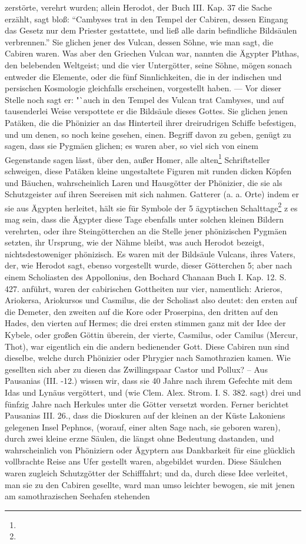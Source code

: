 \documentclass[a4paper, 11pt, oneside, polutonikogreek, german]{article}
\begin{document}
zerstörte, verehrt wurden; allein Herodot, der Buch III. Kap. 37 die Sache erzählt, sagt bloß: "`Cambyses trat in den Tempel der Cabiren, dessen Eingang das Gesetz nur dem Priester gestattete, und ließ alle darin befindliche Bildsäulen verbrennen."' Sie glichen jener des Vulcan, dessen Söhne, wie man sagt, die Cabiren waren. Was aber den Griechen Vulcan war, nannten die Ägypter Phthas, den belebenden Weltgeist; und die vier Untergötter, seine Söhne, mögen sonach entweder die Elemente, oder die fünf Sinnlichkeiten, die in der indischen und persischen Kosmologie gleichfalls erscheinen, vorgestellt haben. --- Vor dieser Stelle noch sagt er: "`auch in den Tempel des Vulcan trat Cambyses, und auf tausenderlei Weise verspottete er die Bildsäule dieses Gottes. Sie glichen jenen Patäken, die die Phönizier an das Hinterteil ihrer dreirudrigen Schiffe befestigen, und um denen, so noch keine gesehen, einen. Begriff davon zu geben, genügt zu sagen, dass sie Pygmäen glichen; es waren aber, so viel sich von einem Gegenstande sagen lässt, über den, außer Homer, alle alten\footnote{} Schriftsteller schweigen, diese Patäken kleine ungestaltete Figuren mit runden dicken Köpfen und Bäuchen, wahrscheinlich Laren und Hausgötter der Phönizier, die sie als Schutzgeister auf ihren Seereisen mit sich nahmen. Gatterer (a. a. Orte) indem er sie aus Ägypten herleitet, hält sie für Symbole der 5 ägyptischen Schalttage\footnote{} z es mag sein, dass die Ägypter diese Tage ebenfalls unter solchen kleinen Bildern verehrten, oder ihre Steingötterchen an die Stelle jener phönizischen Pygmäen setzten, ihr Ursprung, wie der Nähme bleibt, was auch Herodot bezeigt, nichtsdestoweniger phönizisch. Es waren mit der Bildsäule Vulcans, ihres Vaters, der, wie Herodot sagt, ebenso vorgestellt wurde, dieser Götterchen 5; aber nach einem Scholiasten des Appollonius, den Bochard Chanaan Buch I. Kap. 12. S. 427. anführt, waren der cabirischen Gottheiten nur vier, namentlich: Arieros, Ariokersa, Ariokursos und Casmilus, die der Scholiast also deutet: den ersten auf die Demeter, den zweiten auf die Kore oder Proserpina, den dritten auf den Hades, den vierten auf Hermes; die drei ersten stimmen ganz mit der Idee der Kybele, oder großen Göttin überein, der vierte, Casmilus, oder Camilus (Mercur, Thot), war eigentlich ein die andern bedienender Gott. Diese Cabiren nun sind dieselbe, welche durch Phönizier oder Phrygier nach Samothrazien kamen. Wie gesellten sich aber zu diesen das Zwillingspaar Castor und Pollux? -- Aus Pausanias (III. -12.) wissen wir, dass sie 40 Jahre nach ihrem Gefechte mit dem Idas und Lynäus vergöttert, und (wie Clem. Alex. Strom. I. S. 382. sagt) drei und fünfzig Jahre nach Herkules unter die Götter versetzt worden. Ferner berichtet Pausanias III. 26., dass die Dioskuren auf der kleinen an der Küste Lakoniens gelegenen Insel Pephnos, (worauf, einer alten Sage nach, sie geboren waren), durch zwei kleine erzne Säulen, die längst ohne Bedeutung dastanden, und wahrscheinlich von Phöniziern oder Ägyptern aus Dankbarkeit für eine glücklich vollbrachte Reise ans Ufer gestellt waren, abgebildet wurden. Diese Säulchen waren zugleich Schutzgötter der Schifffahrt; und da, durch diese Idee verleitet, man sie zu den Cabiren gesellte, ward man umso leichter bewogen, sie mit jenen am samothrazischen Seehafen stehenden 
\end{document}
